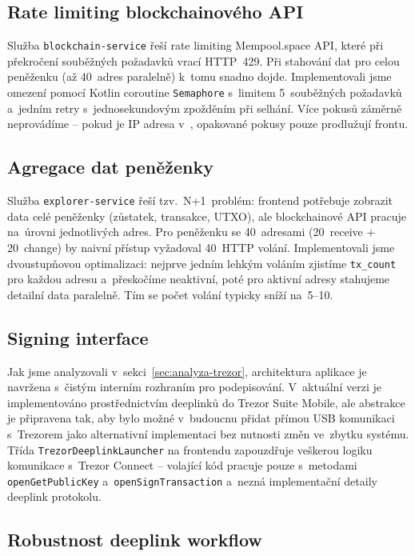 \subsection{Rate limiting blockchainového API}

Služba \texttt{blockchain-service} řeší rate limiting
Mempool.space API, které při překročení souběžných požadavků vrací
HTTP~429. Při stahování dat pro celou peněženku (až 40~adres paralelně)
k~tomu snadno dojde. Implementovali jsme omezení pomocí Kotlin coroutine
\texttt{Semaphore} s~limitem 5~souběžných požadavků a~jedním retry
s~jednosekundovým zpožděním při selhání. Více pokusů záměrně neprovádíme --
pokud je IP adresa v~, opakované pokusy pouze prodlužují
frontu.

\subsection{Agregace dat peněženky}

Služba \texttt{explorer-service} řeší tzv.\ N+1~problém: frontend potřebuje
zobrazit data celé peněženky (zůstatek, transakce, UTXO), ale blockchainové
API pracuje na~úrovni jednotlivých adres. Pro peněženku se 40~adresami
(20~receive + 20~change) by naivní přístup vyžadoval 40~HTTP volání.
Implementovali jsme dvoustupňovou optimalizaci: nejprve jedním lehkým
voláním zjistíme \texttt{tx\_count} pro každou adresu a~přeskočíme neaktivní,
poté pro aktivní adresy stahujeme detailní data paralelně. Tím se počet
volání typicky sníží na~5--10.

\subsection{Signing interface}

Jak jsme analyzovali v~sekci~\ref{sec:analyza-trezor}, architektura aplikace
je navržena s~čistým interním rozhraním pro podepisování. V~aktuální verzi
je implementováno prostřednictvím deeplinků do Trezor Suite Mobile, ale
abstrakce je připravena tak, aby bylo možné v~budoucnu přidat přímou USB
komunikaci s~Trezorem jako alternativní implementaci bez nutnosti změn
ve~zbytku systému. Třída \texttt{TrezorDeeplinkLauncher} na frontendu
zapouzdřuje veškerou logiku komunikace s~Trezor Connect -- volající kód
pracuje pouze s~metodami \texttt{openGetPublicKey} a~\texttt{openSignTransaction}
a~nezná implementační detaily deeplink protokolu.

\subsection{Robustnost deeplink workflow}
\label{subsec:deeplink-workflow}

